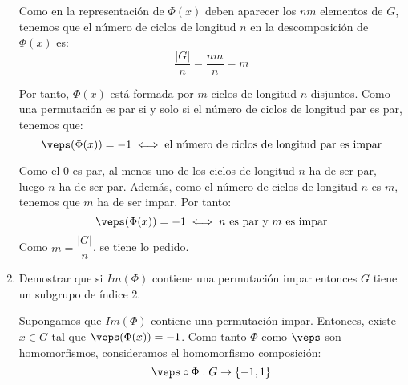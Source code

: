 \begin{ejercicio}
\begin{enumerate}
\begin{comment}
        Por tanto, la descomposición de $\Phi(x)$ en ciclos disjuntos está formada por $n-$ciclos. Veamos ahora por cuántos $n-$ciclos está formada. Veamos en primer lugar que dos $n-$ciclos distintos han de ser disjuntos. Supongamos que $\Phi(x)$ tiene dos $n-$ciclos $C_1$ y $C_2$ tales que $\exists k\in C_1\cap C_2$. Entonces, por cómo actúa $\Phi(x)$, tenemos que:
        \begin{align*}
            k &\mapsto xk \mapsto x^2k \mapsto \cdots \mapsto x^{n-1}k \mapsto x^n k = k
        \end{align*}
        Por tanto, el único ciclo que contiene a $k$ es $(k\ xk\ x^2k\ \cdots\ x^{n-1}k)$, luego $C_1=C_2$.\\

        Por tanto, $\Phi(x)$ está formada por ciclos de longitud $n$ disjuntos. 
        \end{comment}
        
        Como en la representación de $\Phi(x)$ deben aparecer los $nm$ elementos de $G$, tenemos que el número de ciclos de longitud $n$ en la descomposición de $\Phi(x)$ es:
        \begin{equation*}
            \dfrac{|G|}{n} = \dfrac{nm}{n} = m
        \end{equation*}

        Por tanto, $\Phi(x)$ está formada por $m$ ciclos de longitud $n$ disjuntos. Como una permutación es par si y solo si el número de ciclos de longitud par es par, tenemos que:
        \begin{equation*}
            \veps(\Phi(x)) = -1 \iff \text{el número de ciclos de longitud par es impar}
        \end{equation*}

        Como el $0$ es par, al menos uno de los ciclos de longitud $n$ ha de ser par, luego $n$ ha de ser par. Además, como el número de ciclos de longitud $n$ es $m$, tenemos que $m$ ha de ser impar. Por tanto:
        \begin{equation*}
            \veps(\Phi(x)) = -1 \iff n\text{ es par y }m\text{ es impar}
        \end{equation*}
        Como $m=\dfrac{|G|}{n}$, se tiene lo pedido.

        \item Demostrar que si $Im(\Phi)$ contiene una permutación impar entonces $G$ tiene un subgrupo de índice 2.
        
        Supongamos que $Im(\Phi)$ contiene una permutación impar. Entonces, existe $x\in G$ tal que $\veps(\Phi(x))=-1$. Como tanto $\Phi$ como $\veps$ son homomorfismos, consideramos el homomorfismo composición:
        \begin{equation*}
            \veps\circ\Phi: G \to \{-1, 1\}
        \end{equation*}


\end{enumerate}
\end{ejercicio}
